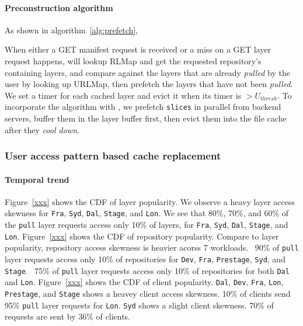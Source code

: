 \paragraph{Preconstruction algorithm}

As shown in algorithm~\ref{alg:prefetch}, 

When either a GET manifest request is received or 
a miss on a GET layer request happens,
\sysname will lookup RLMap and get the requested repository's containing layers,
and compare against the layers that are already \emph{pulled} by the user by looking up URLMap,
then prefetch the layers that have not been \emph{pulled}. 
We set a timer for each cached layer and evict it when its timer is $>U_{thresh}$.
To incorporate the algorithm with \sysname,
we prefetch \texttt{slices} in parallel from backend servers,  
buffer them in the layer buffer first, then evict them into the file cache after they \emph{cool down}.

\subsubsection{User access pattern  based cache replacement}

\paragraph{Temporal trend}

Figure~\ref{xxx} shows the CDF of layer popularity.
We observe a heavy layer access skewness for \texttt{Fra}, \texttt{Syd}, \texttt{Dal}, \texttt{Stage}, 
and \texttt{Lon}.
We see that 80\%, 70\%, and 60\% of the \texttt{pull} layer requests access only 10\% of layers, 
for \texttt{Fra}, \texttt{Syd}, \texttt{Dal}, \texttt{Stage}, 
and \texttt{Lon}.
Figure~\ref{xxx} shows the CDF of repository popularity.
Compare to layer popularity, 
repository access skewness is heavier acorss 7 workloads.
~90\% of \texttt{pull} layer requests access only 10\% of repositories for 
\texttt{Dev}, \texttt{Fra}, \texttt{Prestage}, \texttt{Syd}, and \texttt{Stage}.
~75\% of \texttt{pull} layer requests access only 10\% of repositories for
both \texttt{Dal} and \texttt{Lon}.
Figure~\ref{xxx} shows the CDF of client popularity.
\texttt{Dal}, \texttt{Dev}, \texttt{Fra}, \texttt{Lon}, \texttt{Prestage}, and \texttt{Stage}
shows a heavey client access skewness.
10\% of clients send 95\% \texttt{pull} layer requests for \texttt{Lon}.
\texttt{Syd} shows a slight client skewness. 70\% of requests are sent by 36\% of clients.

